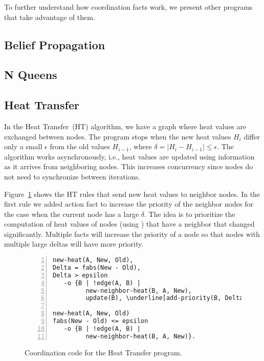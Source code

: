 To further understand how coordination facts work, we present other programs that
take advantage of them.

\subsection{Belief Propagation}\label{sec:coordination:bp}


\subsection{N Queens}\label{section:coord:nqueens}


\subsection{Heat Transfer}\label{section:coord:ht}

In the Heat Transfer~(HT) algorithm, we have a graph where heat values are
exchanged between nodes. The program stops when the new heat values $H_i$
differ only a small $\epsilon$ from the old values $H_{i-1}$, where $\delta =
|H_i - H_{i-1}| \le \epsilon$. The algorithm works asynchronously, i.e., heat
values are updated using information as it arrives from neighboring nodes. This
increases concurrency since nodes do not need to synchronize between
iterations.

Figure~\ref{code:coord:ht} shows the HT rules that send new heat values to
neighbor nodes. In the first rule we added  action fact to
increase the priority of the neighbor nodes for the case when the current node has a large
$\delta$. The idea is to prioritize the computation of heat values of nodes
(using ) that have a neighbor that changed significantly. Multiple
 facts will increase the priority of a node so that nodes
with multiple large deltas will have more priority.

\begin{figure}[h!]
\begin{Verbatim}[numbers=left,fontsize=\codesize,commandchars=\\\[\]]
new-heat(A, New, Old),
Delta = fabs(New - Old),
Delta > epsilon
   -o {B | !edge(A, B) |
         new-neighbor-heat(B, A, New),
         update(B), \underline[add-priority(B, Delta)]}.

new-heat(A, New, Old)
fabs(New - Old) <= epsilon
   -o {B | !edge(A, B) |
         new-neighbor-heat(B, A, New)}.
\end{Verbatim}
  \caption{Coordination code for the Heat Transfer program.}
  \label{code:coord:ht}
\end{figure}


